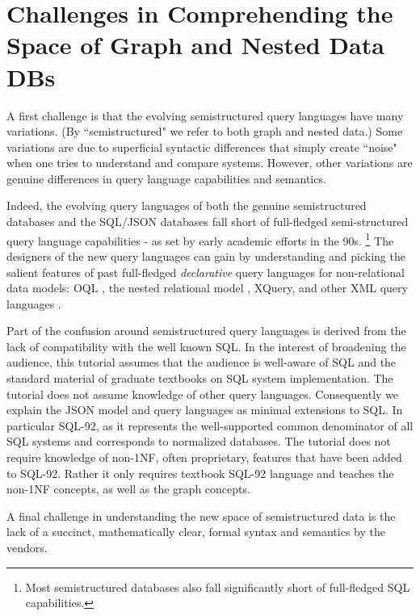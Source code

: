 
\section{Challenges in Comprehending the Space of Graph and Nested Data DBs}
A first challenge is that the evolving semistructured query languages have many variations. (By ``semistructured" we refer to both graph and nested data.) Some variations are due to superficial syntactic differences that simply create ``noise" when one tries to understand and compare systems. However, other variations are genuine differences in query language capabilities and semantics.

Indeed, the evolving query languages of both the genuine semistructured databases and the SQL/JSON databases fall short of full-fledged semi-structured query language capabilities - as set by early academic efforts in the 90s.%
\footnote{Most semistructured databases also fall significantly short of full-fledged SQL capabilities.}
The designers of the new query languages can gain by understanding and picking the salient features of past full-fledged \textit{declarative} query languages for non-relational data models: OQL \cite{oql-dbpl-1989}, the nested relational model \cite{nest-unnest-pods-1982,nested-relational-vldb-1988,nested-relational-workshop-lncs-1989}, 
XQuery, and other XML query languages \cite{xquery-3.0-w3c-2013,xml-ql-computer-networks-1999,xml-query-language-survey-sigmod-record-2000}.

Part of the confusion around semistructured query languages is derived from the lack of compatibility with the well known SQL. In the interest of broadening the audience, this tutorial assumes that the audience is well-aware of SQL and the standard material of graduate textbooks on SQL system implementation. The tutorial does not assume knowledge of other query languages. Consequently we explain the JSON model and query languages as minimal extensions to SQL. In particular SQL-92, as it represents the well-supported common denominator of all SQL systems and corresponds to normalized databases. The tutorial does not require knowledge of non-1NF, often proprietary, features that have been added to SQL-92. Rather it only requires textbook SQL-92 language and teaches the non-1NF concepts, as well as the graph concepts.

A final challenge in understanding the new space of semistructured data is the lack of a succinct, mathematically clear, formal syntax and semantics by the vendors. 

